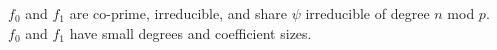 \documentclass[preview]{standalone}
\begin{document}
$f_0$ and $f_1$ are co-prime, irreducible, and share $\psi$ irreducible of degree $n$ mod $p$.\\$f_0$ and $f_1$ have small degrees and coefficient sizes.\\
\end{document}
